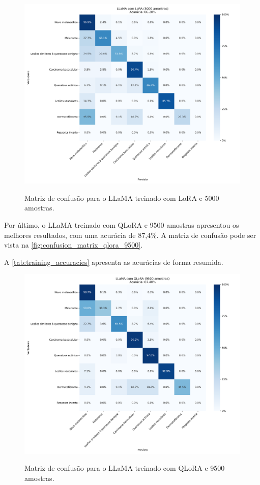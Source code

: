 \begin{figure}[ht]
    \centering
    \caption{\small Matriz de confusão para o \ac{LLaMA} treinado com \ac{LoRA} e 5000 amostras.}
    \includegraphics[width=1\columnwidth,keepaspectratio]{images/confusion_matrix_lora_5000.png}
    \label{fig:confusion_matrix_lora_5000}
\end{figure}

Por último, o \ac{LLaMA} treinado com \ac{QLoRA} e 9500 amostras apresentou os melhores resultados, com uma acurácia de 87,4\%. A matriz de confusão pode ser vista na
\autoref{fig:confusion_matrix_qlora_9500}.

A \autoref{tab:training_accuracies} apresenta as acurácias de forma resumida.

\begin{figure}[ht]
    \centering
    \caption{\small Matriz de confusão para o \ac{LLaMA} treinado com \ac{QLoRA} e 9500 amostras.}
    \includegraphics[width=1\columnwidth,keepaspectratio]{images/confusion_matrix_qlora_9500.png}
    \label{fig:confusion_matrix_qlora_9500}
\end{figure}

